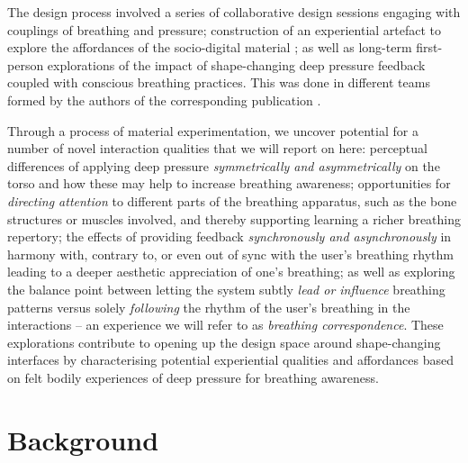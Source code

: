 The design process involved a series of collaborative design sessions engaging with couplings of breathing and pressure; construction of an experiential artefact \cite{sundstrom_experiential_2011} to explore the affordances of the socio-digital material \cite{designing_2018}; as well as long-term first-person explorations of the impact of shape-changing deep pressure feedback coupled with conscious breathing practices. This was done in different teams formed by the authors of the corresponding publication \cite{jung_exploring_2021}. 

Through a process of material experimentation, we uncover potential for a number of novel interaction qualities that we will report on here: perceptual differences of applying deep pressure \textit{symmetrically and asymmetrically} on the torso and how these may help to increase breathing awareness; opportunities for \textit{directing attention} to different parts of the breathing apparatus, such as the bone structures or muscles involved, and thereby supporting learning a richer breathing repertory; the effects of providing feedback \textit{synchronously and asynchronously} in harmony with, contrary to, or even out of sync with the user's breathing rhythm leading to a deeper aesthetic appreciation of one's breathing; as well as exploring the balance point between letting the system subtly \textit{lead or influence} breathing patterns versus solely \textit{following} the rhythm of the user's breathing in the interactions -- an experience we will refer to as \textit{breathing correspondence}. These explorations contribute to opening up the design space around shape-changing interfaces by characterising potential experiential qualities and affordances based on felt bodily experiences of deep pressure for breathing awareness. 


\section{Background}

